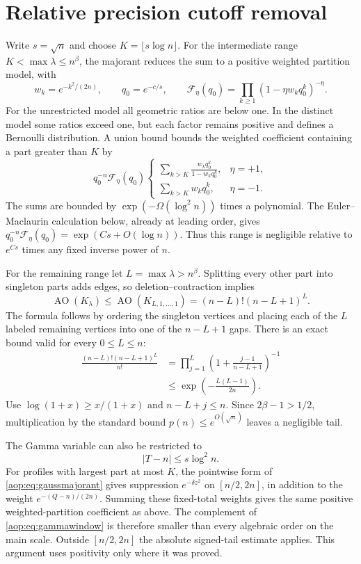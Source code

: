 \documentclass[11pt]{article}
\theoremstyle{remark}\newtheorem{remark}[theorem]{Remark}
\newcommand{\AO}{\operatorname{AO}}
\begin{document}
\section{Relative precision cutoff removal}\label{aop:sec:cutoff}

Write $s=\sqrt n$ and choose $K=\lfloor s\log n\rfloor$. For the
intermediate range $K<\max\lambda\le n^\beta$, the majorant reduces the
sum to a positive weighted partition model, with
\[
 w_k=e^{-k^2/(2n)},\qquad q_0=e^{-c/s},\qquad
 \mathcal F_\eta(q_0)=\prod_{k\ge1}(1-\eta w_kq_0^k)^{-\eta}.
\]
For the unrestricted model all geometric ratios are below one. In the
distinct model some ratios exceed one, but each factor remains positive
and defines a Bernoulli distribution. A union bound bounds the weighted
coefficient containing a part greater than $K$ by
\begin{equation}\label{aop:eq:union}
 q_0^{-n}\mathcal F_\eta(q_0)
 \begin{cases}
 \displaystyle\sum_{k>K}\frac{w_kq_0^k}{1-w_kq_0^k},&\eta=+1,\\[1ex]
 \displaystyle\sum_{k>K}w_kq_0^k,&\eta=-1.
 \end{cases}
\end{equation}
The sums are bounded by $\exp(-\Omega(\log^2 n))$ times a polynomial.
The Euler--Maclaurin calculation below, already at leading order, gives
$q_0^{-n}\mathcal F_\eta(q_0)=\exp(Cs+O(\log n))$.
Thus this range is negligible relative to $e^{Cs}$ times any fixed
inverse power of $n$.

For the remaining range let $L=\max\lambda>n^\beta$. Splitting every
other part into singleton parts adds edges, so deletion--contraction
implies
\[
 \AO(K_\lambda)\le\AO(K_{L,1,\ldots,1})=(n-L)!(n-L+1)^L.
\]
The formula follows by ordering the singleton vertices and placing each
of the $L$ labeled remaining vertices into one of the $n-L+1$ gaps.
There is an exact bound valid for every $0\le L\le n$:
\begin{align}
 \frac{(n-L)!(n-L+1)^L}{n!}
 &=\prod_{j=1}^L\left(1+\frac{j-1}{n-L+1}\right)^{-1}\\
 &\le\exp\left(-\frac{L(L-1)}{2n}\right).
 \label{aop:eq:fartail}
\end{align}
Use $\log(1+x)\ge x/(1+x)$ and $n-L+j\le n$.
Since $2\beta-1>1/2$, multiplication by the standard bound
$p(n)\le e^{O(\sqrt n)}$ leaves a negligible tail.

The Gamma variable can also be restricted to
\begin{equation}\label{aop:eq:gammawindow}
 |T-n|\le s\log^2 n.
\end{equation}
For profiles with largest part at most $K$, the pointwise form of
\eqref{aop:eq:gaussmajorant} gives suppression $e^{-\delta z^2}$ on
$[n/2,2n]$, in addition to the weight $e^{-(Q-n)/(2n)}$. Summing these
fixed-total weights gives the same positive weighted-partition
coefficient as above. The complement of \eqref{aop:eq:gammawindow} is
therefore smaller than every algebraic order on the main scale.
Outside $[n/2,2n]$ the absolute signed-tail estimate applies.
This argument uses positivity only where it was proved.
\end{document}

